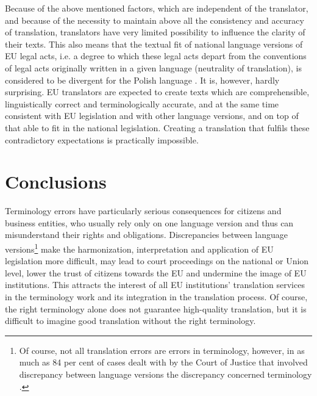 \documentclass[output=paper]{langsci/langscibook}
\begin{document}
Because of the above mentioned factors, which are independent of the translator, and because of the necessity to maintain above all the consistency and accuracy of translation, translators have very limited possibility to influence the clarity of their texts. This also means that the textual fit of national language versions of EU legal acts, i.e. a degree to which these legal acts depart from the conventions of legal acts originally written in a given language (neutrality of translation), is considered to be divergent for the Polish language \citep[289-292]{Biel2014}. It is, however, hardly surprising. EU translators are expected to create texts which are comprehensible, linguistically correct and terminologically accurate, and at the same time consistent with EU legislation and with other language versions, and on top of that able to fit in the national legislation. Creating a translation that fulfils these contradictory expectations is practically impossible.

\section{Conclusions}\label{sec:stefaniak:4}

Terminology errors have particularly serious consequences for citizens and business entities, who usually rely only on one language version and thus can misunderstand their rights and obligations. Discrepancies between language versions\footnote{Of course, not all translation errors are errors in terminology, however, in as much as 84 per cent of cases dealt with by the Court of Justice that involved discrepancy between language versions the discrepancy concerned terminology \citep[28]{DGT2012}.} make the harmonization, interpretation and application of EU legislation more difficult, may lead to court proceedings on the national or Union level, lower the trust of citizens towards the EU and undermine the image of EU institutions. This attracts the interest of all EU institutions’ translation services in the terminology work and its integration in the translation process. Of course, the right terminology alone does not guarantee high-quality translation, but it is difficult to imagine good translation without the right terminology.


\sloppy
\printbibliography[heading=subbibliography,notkeyword=this] 
\end{document}
